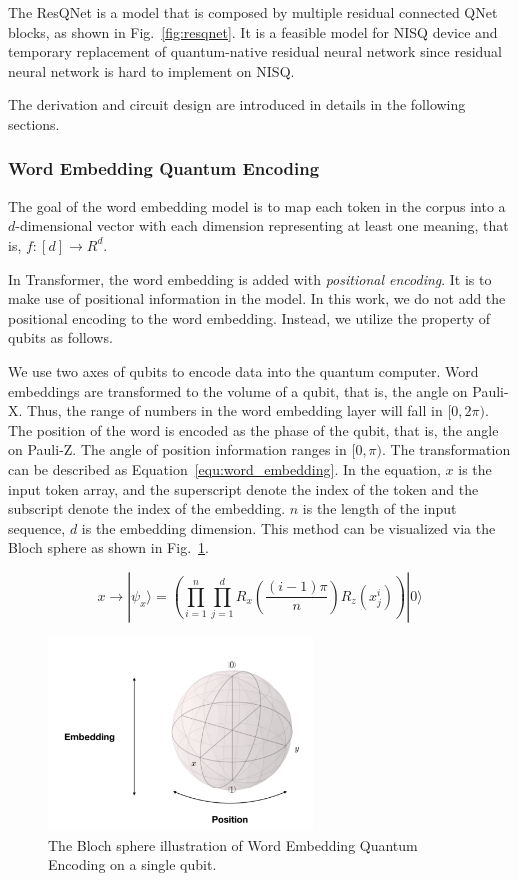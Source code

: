 The ResQNet is a model that is composed by multiple residual connected QNet blocks, as shown in Fig.~\ref{fig:resqnet}. It is a feasible model for NISQ device and temporary replacement of quantum-native residual neural network since residual neural network is hard to implement on NISQ.

The derivation and circuit design are introduced in details in the following sections.

\subsubsection{Word Embedding Quantum Encoding}
The goal of the word embedding model is to map each token in the corpus into a $d$-dimensional vector with each dimension representing at least one meaning, that is, $f: [d] \rightarrow R^d$. 

In Transformer, the word embedding is added with \emph{positional encoding}. It is to make use of positional information in the model. In this work, we do not add the positional encoding to the word embedding. Instead, we utilize the property of qubits as follows.

We use two axes of qubits to encode data into the quantum computer. Word embeddings are transformed to the volume of a qubit, that is, the angle on Pauli-X. Thus, the range of numbers in the word embedding layer will fall in $[0, 2\pi)$. The position of the word is encoded as the phase of the qubit, that is, the angle on Pauli-Z. The angle of position information ranges in $[0, \pi)$. The transformation can be described as Equation~\ref{equ:word_embedding}. In the equation, $x$ is the input token array, and the superscript denote the index of the token and the subscript denote the index of the embedding. $n$ is the length of the input sequence, $d$ is the embedding dimension. This method can be visualized via the Bloch sphere as shown in Fig.~\ref{fig:word-sphere}.

\begin{equation} \label{equ:word_embedding}
x \rightarrow |\psi_x\rangle = ( \prod_{i=1}^n \prod_{j=1}^d R_x( \frac{(i-1) \pi}{n} )R_z(x^i_j) ) |0\rangle
\end{equation}

\begin{figure}[htp!]
    \centering
    \includegraphics[width=7cm]{images/word-sphere.png}
    \caption{The Bloch sphere illustration of Word Embedding Quantum Encoding on a single qubit.}
    \label{fig:word-sphere}
\end{figure}

